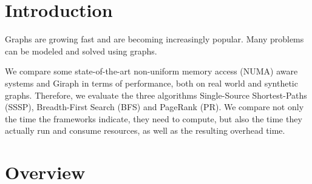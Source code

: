 \documentclass{meetings}
\author{S. König, L. Matzner, F. Rollbühler and J. Schmid}
\date{Tuesday, 20\textsuperscript{th} October 2020}
\begin{document}
\section{Introduction}
Graphs are growing fast and are becoming increasingly popular. Many problems can be modeled and solved using graphs.



We compare some state-of-the-art non-uniform memory access (NUMA) aware systems and Giraph in terms of performance, both on real world and synthetic graphs.
Therefore, we evaluate the three algorithms Single-Source Shortest-Paths (SSSP), Breadth-First Search (BFS) and PageRank (PR).
We compare not only the time the frameworks indicate, they need to compute, but also the time they actually run and consume resources, as well as the resulting overhead time.

\clearpage
\section{Overview}


\clearpage
\end{document}
